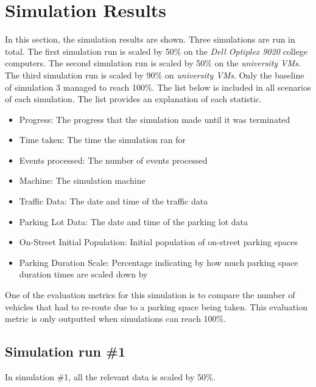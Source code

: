 \pagebreak

\section{Simulation Results}
In this section, the simulation results are shown. Three simulations are run in total. The first simulation run is scaled by 50\% on the \textit{Dell Optiplex 9020} college computers. The second simulation run is scaled by 50\% on the \textit{university VMs}. The third simulation run is scaled by 90\% on \textit{university VMs}. Only the baseline of simulation 3 managed to reach 100\%. The list below is included in all scenarios of each simulation. The list provides an explanation of each statistic.

\begin{itemize}
    \setlength\itemsep{0em}
    \item Progress: The progress that the simulation made until it was terminated
    \item Time taken: The time the simulation ran for
    \item Events processed: The number of events processed
    \item Machine: The simulation machine
    \item Traffic Data: The date and time of the traffic data
    \item Parking Lot Data: The date and time of the parking lot data
    \item On-Street Initial Population: Initial population of on-street parking spaces
    \item Parking Duration Scale: Percentage indicating by how much parking space duration times are scaled down by
\end{itemize}

One of the evaluation metrics for this simulation is to compare the number of vehicles that had to re-route due to a parking space being taken. This evaluation metric is only outputted when simulations can reach 100\%.

\pagebreak

\subsection{Simulation run \#1}
In simulation \#1, all the relevant data is scaled by 50\%.
